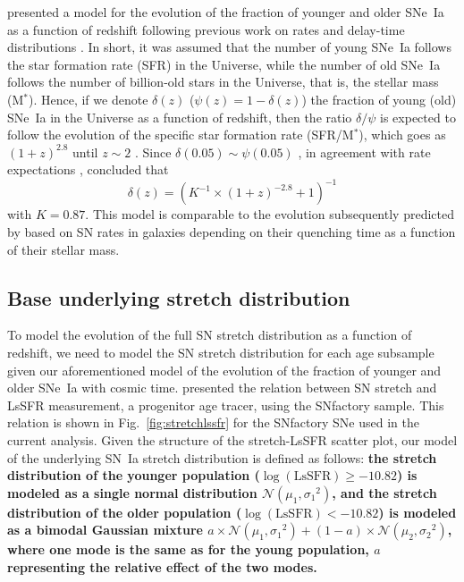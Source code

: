 \documentclass[]{aa}
\begin{document}
\cite{rigault2020} presented a model for the evolution of the fraction of
younger and older SNe~Ia as a function of redshift following previous work on
rates and delay-time distributions \citep[e.g.,][]{mannucci2005,
scannapieco2005, sullivan2006, smith2012, childress2014, maozmannucci2014}. In
short, it was assumed that the number of young SNe~Ia follows the star formation
rate (SFR) in the Universe, while the number of old SNe~Ia follows the number of
billion-old stars in the Universe, that is, the stellar mass (M$^*$). Hence, if
we denote $\delta(z)$ ($\psi(z) = 1-\delta(z)$) the fraction of young (old)
SNe~Ia in the Universe as a function of redshift, then the ratio $\delta/\psi$
is expected to follow the evolution of the specific star formation rate
(SFR/M$^*$), which goes as $(1+z)^{2.8}$ until $z\sim2$
\citep[e.g.,][]{tasca2015}. Since $\delta(0.05) \sim \psi(0.05)$
\citep{rigault2013, rigault2020, wiseman2020}, in agreement with rate
expectations \citep{mannucci2006, rodney2014}, \cite{rigault2020} concluded that
\begin{equation}
    \label{eq:delta}
    \delta(z) = \left( K^{-1} \times (1+z)^{-2.8} +1 \right)^{-1}
\end{equation}
with $K=0.87$. This model is comparable to the evolution subsequently
predicted by \cite{childress2014} based on SN rates in galaxies depending on
their quenching time as a function of their stellar mass.

\subsection{Base underlying stretch distribution}
\label{sec:basemodel}

To model the evolution of the full SN stretch distribution as a function of
redshift, we need to model the SN stretch distribution for each age subsample
given our aforementioned model of the evolution of the fraction of younger and
older SNe~Ia with cosmic time. \cite{rigault2020} presented the relation between
SN stretch and LsSFR measurement, a progenitor age tracer, using the SNfactory
sample. This relation is shown in Fig.~\ref{fig:stretchlssfr} for the SNfactory
SNe used in the current analysis. Given the structure of the stretch-LsSFR
scatter plot, our model of the underlying SN~Ia stretch distribution is defined
as follows: \textbf{the stretch distribution of the younger population
($\log(\mathrm{LsSFR})\geq-10.82$) is modeled as a single normal distribution
$\mathcal{N}(\mu_1, \sigma_1{}^2)$, and the stretch distribution of the older
population ($\log(\mathrm{LsSFR})<-10.82$) is modeled as a bimodal Gaussian
mixture $a\times \mathcal{N}(\mu_1, \sigma_1{}^2) + (1-a)\times
\mathcal{N}(\mu_2, \sigma_2{}^2)$, where one mode is the same as for the young
population, $a$ representing the relative effect of the two modes.}
\end{document}
